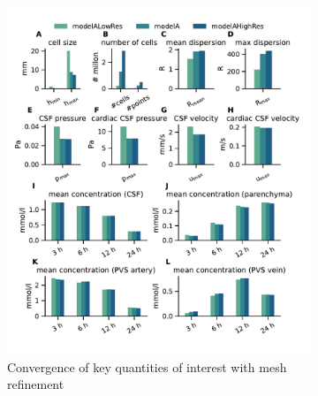 \documentclass[fleqn,10pt]{wlscirep}
\begin{document}
\begin{figure}
    \centering
    \begin{subfigure}[b]{0.49\textwidth}
        \centering
        \includegraphics[trim={0.5cm 1cm 0.05cm 0.8cm}, clip, width = 1.05 \linewidth]{figures/modelALowRes_modelA_modelAHighRes.pdf}
        \caption*{Convergence of key quantities of interest with mesh refinement}
    \end{subfigure}
    \begin{subfigure}[b]{0.49\textwidth}
        \centering

\end{subfigure}
\end{figure}
\end{document}
